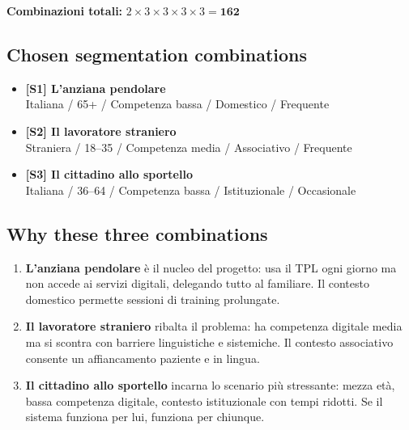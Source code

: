 ﻿\documentclass[11pt,a4paper]{article}
\begin{document}
\vspace{0.2cm}
\begin{flushleft}
\textbf{Combinazioni totali:}
\quad $2 \times 3 \times 3 \times 3 \times 3 = \mathbf{162}$
\end{flushleft}
\vspace{0.2cm}

\subsection{Chosen segmentation combinations}

\begin{tcolorbox}[base]
\begin{itemize}[leftmargin=*,itemsep=6pt]
    \item {}\label{seg:anziana}
    \textbf{[S1] L'anziana pendolare}\\
    Italiana / 65+ / Competenza bassa / Domestico / Frequente
    \item {}\label{seg:straniero}
    \textbf{[S2] Il lavoratore straniero}\\
    Straniera / 18--35 / Competenza media / Associativo / Frequente
    \item {}\label{seg:cittadino}
    \textbf{[S3] Il cittadino allo sportello}\\
    Italiana / 36--64 / Competenza bassa / Istituzionale / Occasionale
\end{itemize}
\end{tcolorbox}

\vspace{0.4cm}

\subsection{Why these three combinations}

\begin{enumerate}[leftmargin=*]
    \item \textbf{L'anziana pendolare} è il nucleo del progetto:
    usa il TPL ogni giorno ma non accede ai servizi digitali, delegando
    tutto al familiare. Il contesto domestico permette sessioni di
    training prolungate.
    \item \textbf{Il lavoratore straniero} ribalta il problema:
    ha competenza digitale media ma si scontra con barriere linguistiche
    e sistemiche. Il contesto associativo consente un affiancamento
    paziente e in lingua.
    \item \textbf{Il cittadino allo sportello} incarna lo scenario
    più stressante: mezza età, bassa competenza digitale, contesto
    istituzionale con tempi ridotti. Se il sistema funziona per lui,
    funziona per chiunque.
\end{enumerate}
\end{document}

